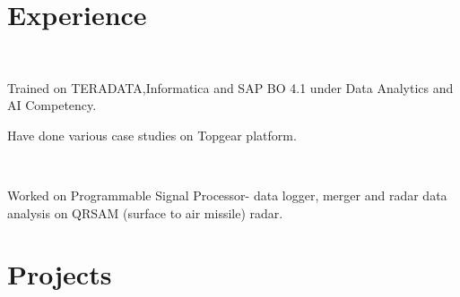 \documentclass[a4paper]{deedy-resume} %
\begin{document}

%
%


\section{Experience}


\\
\begin{tightitemize}
\item Trained on TERADATA,Informatica and SAP BO 4.1 under Data Analytics and AI Competency.
\item Have done various case studies on Topgear platform.

\end{tightitemize}

\\
\begin{tightitemize}
\item Worked on Programmable Signal Processor- data logger, merger and radar data analysis on QRSAM (surface to air missile) radar.
\end{tightitemize}


\section{Projects}
\end{document}
